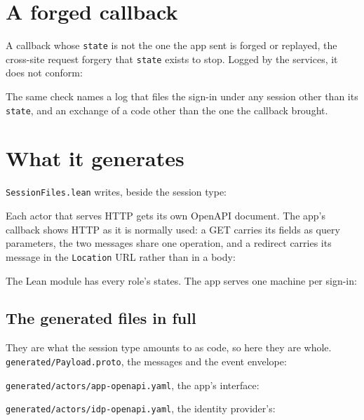 \section{A forged callback}

A callback whose \texttt{state} is not the one the app sent is forged or replayed,
the cross-site request forgery that \texttt{state} exists to stop. Logged by the
services, it does not conform:





The same check names a log that files the sign-in under any session other than
its \texttt{state}, and an exchange of a code other than the one the callback
brought.

\section{What it generates}

\texttt{SessionFiles.lean} writes, beside the session type:



Each actor that serves HTTP gets its own OpenAPI document. The app's callback
shows HTTP as it is normally used: a GET carries its fields as query parameters,
the two messages share one operation, and a redirect carries its message in the
\texttt{Location} URL rather than in a body:



The Lean module has every role's states. The app serves one machine per sign-in:



\subsection*{The generated files in full}

They are what the session type amounts to as code, so here they are whole.
\texttt{generated/Payload.proto}, the messages and the event envelope:



\texttt{generated/actors/app-openapi.yaml}, the app's interface:



\texttt{generated/actors/idp-openapi.yaml}, the identity provider's:

